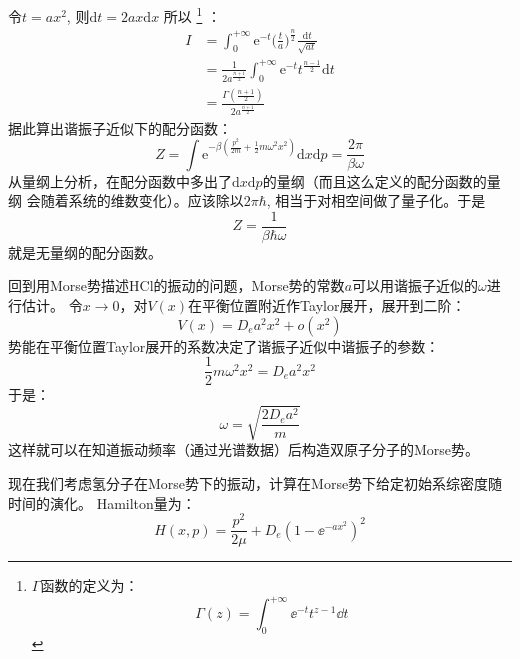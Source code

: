     令$t = ax^2$, 则$\mathrm{d}t = 2ax\mathrm{d}x$
    所以
    \footnote{$\Gamma$函数的定义为：
    \begin{equation}
        \Gamma(z) = \int_{0}^{+\infty}\ee^{-t}t^{z-1}\dd t
    \end{equation}
    }
    ：
    \begin{equation}
        \begin{split}
            I &= \int_0^{+\infty} \mathrm{e}^{-t} \bigg(\frac ta\bigg)^{\frac n2} \frac {\mathrm{d}t}{\sqrt{at}}\\
            &= \frac 1{2a^{\frac {n+1}2}} \int_0^{+\infty} \mathrm{e}^{-t} t^{\frac {n-1}2} \mathrm{d}t\\
            &= \frac {\Gamma(\frac {n+1}2)}{2a^{\frac {n+1}2}}
        \end{split}
    \end{equation}
    据此算出谐振子近似下的配分函数：
    \begin{equation}
        Z = \int \mathrm{e}^{-\beta (\frac {p^2}{2m} + \frac 12 m\omega^2 x^2)} \mathrm{d}x\mathrm{d}p = \frac {2\pi}{\beta \omega}
    \end{equation}
    从量纲上分析，在配分函数中多出了$\mathrm{d}x\mathrm{d}p$的量纲（而且这么定义的配分函数的量纲
    会随着系统的维数变化）。应该除以$2\pi\hbar$, 相当于对相空间做了量子化。于是
    \begin{equation}
        Z = \frac 1{\beta \hbar \omega}
    \end{equation}
    就是无量纲的配分函数。
    \par 
    回到用Morse势描述HCl的振动的问题，Morse势的常数$a$可以用谐振子近似的$\omega$进行估计。
    令$x \to 0 $，对$V(x)$在平衡位置附近作Taylor展开，展开到二阶：
    \begin{equation}
        V(x) = D_e a^2 x^2 + o(x^2)
    \end{equation}
    势能在平衡位置Taylor展开的系数决定了谐振子近似中谐振子的参数：
    \begin{equation}
        \frac 12 m\omega^2x^2 = D_e a^2 x^2
    \end{equation}
    于是：
    \begin{equation}
        \omega = \sqrt{\frac {2D_ea^2}m}
        \label{omega of Morse}
    \end{equation}
    这样就可以在知道振动频率（通过光谱数据）后构造双原子分子的Morse势。
    \par 
    现在我们考虑氢分子在Morse势下的振动，计算在Morse势下给定初始系综密度随时间的演化。
    Hamilton量为：
    \begin{equation}
        H(x, p) = \frac{p^2}{2\mu} + D_e(1-\ee^{-ax^2})^2
    \end{equation}
